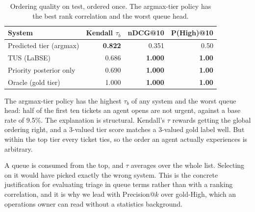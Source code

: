 \begin{table}[!tb]
\caption{Ordering quality on test, ordered once. The argmax-tier policy has the
best rank correlation and the worst queue head.}
\label{tab:rank}
\centering
\small
\begin{tabular}{@{}lrrr@{}}
\toprule
System & Kendall $\tau_b$ & nDCG@10 & P(High)@10 \\
\midrule
Predicted tier (argmax)  & \textbf{0.822} & 0.351 & 0.50 \\
TUS (LaBSE)              & 0.686 & \textbf{1.000} & \textbf{1.00} \\
Priority posterior only  & 0.690 & \textbf{1.000} & \textbf{1.00} \\
Oracle (gold tier)       & 1.000 & \textbf{1.000} & \textbf{1.00} \\
\bottomrule
\end{tabular}
\end{table}

The argmax-tier policy has the highest $\tau_b$ of any system and the worst queue
head: half of the first ten tickets an agent opens are not urgent, against a base
rate of 9.5\%. The explanation is structural. Kendall's $\tau$ rewards getting
the global ordering right, and a 3-valued tier score matches a 3-valued gold
label well. But within the top tier every ticket ties, so the order an agent
actually experiences is arbitrary.

A queue is consumed from the top, and $\tau$ averages over the whole list.
Selecting on it would have picked exactly the wrong system. This is the concrete
justification for evaluating triage in queue terms rather than with a ranking
correlation, and it is why we lead with Precision@$k$ over gold-High, which an
operations owner can read without a statistics background.

